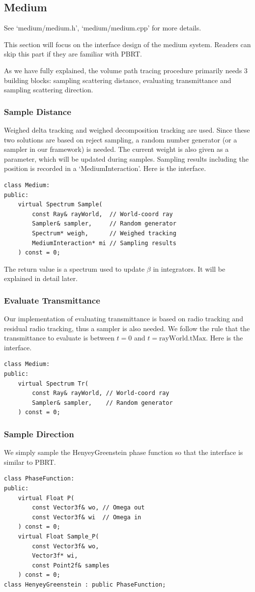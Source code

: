 \documentclass[acmtog]{acmart}
\begin{document}
\subsection{Medium}
    See `medium/medium.h', `medium/medium.cpp' for more details.\par
        This section will focus on the interface design of the medium system.
    Readers can skip this part if they are familiar with PBRT.\par
        As we have fully explained, the volume path tracing procedure primarily needs 3 building blocks:
    sampling scattering distance, evaluating transmittance and sampling scattering direction.\par
\subsubsection{Sample Distance}
        Weighed delta tracking and weighed decomposition tracking are used.
    Since these two solutions are based on reject sampling, a random number generator (or a sampler in our framework) is needed.
    The current weight is also given as a parameter, which will be updated during samples.
    Sampling results including the position is recorded in a `MediumInteraction'.
    Here is the interface.
\begin{lstlisting}
class Medium:
public:
    virtual Spectrum Sample(
        const Ray& rayWorld,  // World-coord ray
        Sampler& sampler,     // Random generator
        Spectrum* weigh,      // Weighed tracking
        MediumInteraction* mi // Sampling results
    ) const = 0;
\end{lstlisting}
    The return value is a spectrum used to update $\beta$ in integrators.
    It will be explained in detail later.
\subsubsection{Evaluate Transmittance}
        Our implementation of evaluating transmittance is based on radio tracking and residual radio tracking, thus a sampler is also needed.
    We follow the rule that the transmittance to evaluate is between $t = 0$ and $t = \mathrm{rayWorld.tMax}$.
    Here is the interface.
\begin{lstlisting}
class Medium:
public:
    virtual Spectrum Tr(
        const Ray& rayWorld, // World-coord ray
        Sampler& sampler,    // Random generator
    ) const = 0;
\end{lstlisting}
\subsubsection{Sample Direction}
        We simply sample the HenyeyGreenstein phase function so that the interface is similar to PBRT.
\begin{lstlisting}
class PhaseFunction:
public:
    virtual Float P(
        const Vector3f& wo, // Omega out
        const Vector3f& wi  // Omega in
    ) const = 0;
    virtual Float Sample_P(
        const Vector3f& wo, 
        Vector3f* wi, 
        const Point2f& samples
    ) const = 0;
class HenyeyGreenstein : public PhaseFunction;
\end{lstlisting}
\end{document}
